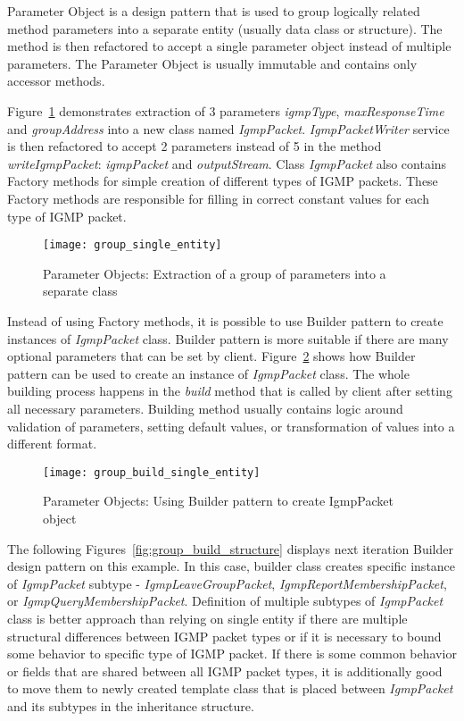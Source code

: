 Parameter Object is a design pattern that is used to group logically related method parameters into a separate entity
(usually data class or structure).
The method is then refactored to accept a single parameter object instead of multiple parameters.
The Parameter Object is usually immutable and contains only accessor methods.

Figure~\ref{fig:group_single_entity} demonstrates extraction of 3 parameters \textit{igmpType},
\textit{maxResponseTime} and \textit{groupAddress} into a new class named \textit{IgmpPacket}.
\textit{IgmpPacketWriter} service is then refactored to accept 2 parameters instead of 5 in the method
\textit{writeIgmpPacket}: \textit{igmpPacket} and \textit{outputStream}.
Class \textit{IgmpPacket} also contains Factory methods for simple creation of different types of IGMP packets.
These Factory methods are responsible for filling in correct constant values for each type of IGMP packet.

\begin{figure}[!htb]
    \centering
    \texttt{[image: group\_single\_entity]}
    \caption{Parameter Objects: Extraction of a group of parameters into a separate class}
    \label{fig:group_single_entity}
\end{figure}

Instead of using Factory methods, it is possible to use Builder pattern to create
instances of \textit{IgmpPacket} class.
Builder pattern is more suitable if there are many optional parameters that can be set by client.
Figure~\ref{fig:group_build_single_entity} shows how Builder pattern can be used to create an instance
of \textit{IgmpPacket} class.
The whole building process happens in the \textit{build} method that is called by client after setting all necessary
parameters.
Building method usually contains logic around validation of parameters, setting default values, or transformation
of values into a different format.

\begin{figure}[!htb]
    \centering
    \texttt{[image: group\_build\_single\_entity]}
    \caption{Parameter Objects: Using Builder pattern to create IgmpPacket object}
    \label{fig:group_build_single_entity}
\end{figure}

The following Figures~\ref{fig:group_build_structure} displays next iteration Builder design pattern on this example.
In this case, builder class creates specific instance of \textit{IgmpPacket} subtype - \textit{IgmpLeaveGroupPacket},
\textit{IgmpReportMembershipPacket}, or \textit{IgmpQueryMembershipPacket}.
Definition of multiple subtypes of \textit{IgmpPacket} class is better approach than relying on single entity
if there are multiple structural differences between IGMP packet types or if it is necessary to bound some behavior
to specific type of IGMP packet.
If there is some common behavior or fields that are shared between all IGMP packet types, it is additionally good
to move them to newly created template class that is placed between \textit{IgmpPacket} and its subtypes
in the inheritance structure.

